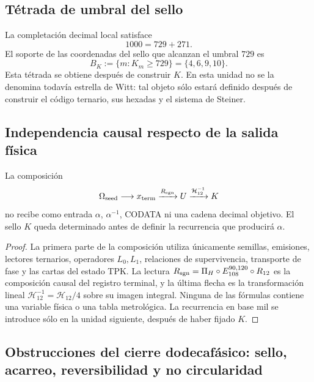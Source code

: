 \subsection{Tétrada de umbral del sello}

La completación decimal local satisface
\[
 1000=729+271.
\]
El soporte de las coordenadas del sello que alcanzan el umbral \(729\) es
\begin{equation}
 \boxed{
 B_K:=\{m:K_m\geq729\}=\{4,6,9,10\}.}
 \label{p3-83-c25-s4:eq:tetrada-umbral-k}
\end{equation}
Esta tétrada se obtiene después de construir \(K\). En esta unidad no se la
denomina todavía estrella de Witt: tal objeto sólo estará definido después
de construir el código ternario, sus hexadas y el sistema de Steiner.

\subsection{Independencia causal respecto de la salida física}

\begin{theorem}[Aislamiento de \(U\) y \(K\)]
\label{p3-83-c25-s4:thm:aislamiento-u-k-alpha-codata}
La composición
\begin{equation}
 \Omega_{\rm seed}\longrightarrow x_{\rm term}
 \xrightarrow{R_{\rm sgn}}U
 \xrightarrow{\mathcal H_{12}^{-1}}K
 \label{p3-83-c25-s4:eq:composicion-upstream-u-k}
\end{equation}
no recibe como entrada \(\alpha\), \(\alpha^{-1}\), CODATA ni una cadena
decimal objetivo. El sello \(K\) queda determinado antes de definir la
recurrencia que producirá \(\alpha\).
\end{theorem}

\begin{proof}
La primera parte de la composición utiliza únicamente semillas, emisiones,
lectores ternarios, operadores \(L_0,L_1\), relaciones de supervivencia,
transporte de fase y las cartas del estado TPK. La lectura
\(R_{\rm sgn}=\Pi_H\circ E_{108}^{90,120}\circ R_{12}\) es la composición
causal del registro terminal, y la última flecha es la transformación lineal
\(\mathcal H_{12}^{-1}=\mathcal H_{12}/4\)
sobre su imagen integral. Ninguna de las fórmulas contiene una variable
física o una tabla metrológica. La recurrencia en base mil se introduce sólo
en la unidad siguiente, después de haber fijado \(K\).
\end{proof}

\subsection{Obstrucciones del cierre dodecafásico: sello, acarreo, reversibilidad y no circularidad}

